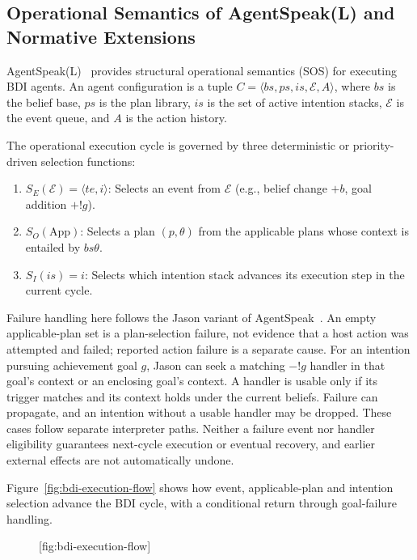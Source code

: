 \documentclass[11pt,a4paper]{article}
\begin{document}
\subsection{Operational Semantics of AgentSpeak(L) and Normative Extensions}

AgentSpeak(L)~ provides structural operational semantics (SOS) for executing BDI agents. An agent configuration is a tuple $C = \langle bs, ps, is, \mathcal{E}, A \rangle$, where $bs$ is the belief base, $ps$ is the plan library, $is$ is the set of active intention stacks, $\mathcal{E}$ is the event queue, and $A$ is the action history.

The operational execution cycle is governed by three deterministic or priority-driven selection functions:
\begin{enumerate}[leftmargin=1.8em,itemsep=2pt]
  \item $S_E(\mathcal{E}) = \langle te, i \rangle$: Selects an event from $\mathcal{E}$ (e.g., belief change $+b$, goal addition $+!g$).
  \item $S_O(\mathrm{App})$: Selects a plan $(p, \theta)$ from the applicable plans whose context is entailed by $bs\theta$.
  \item $S_I(is) = i$: Selects which intention stack advances its execution step in the current cycle.
\end{enumerate}

Failure handling here follows the Jason variant of AgentSpeak~.
An empty applicable-plan set is a plan-selection failure, not evidence that a
host action was attempted and failed; reported action failure is a separate cause.
For an intention pursuing achievement goal $g$, Jason can seek a matching
$-!g$ handler in that goal's context or an enclosing goal's context. A handler
is usable only if its trigger matches and its context holds under the current
beliefs. Failure can propagate, and an intention without a usable handler may be
dropped. These cases follow separate interpreter paths.
Neither a failure event nor handler eligibility guarantees next-cycle execution
or eventual recovery, and earlier external effects are not automatically undone.

Figure~\ref{fig:bdi-execution-flow} shows how event, applicable-plan and intention
selection advance the BDI cycle, with a conditional return through goal-failure handling.

\begin{figure}[tp]
  \centering
  [fig:bdi-execution-flow]
\end{figure}
\end{document}
